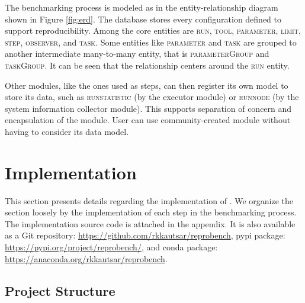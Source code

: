 The benchmarking process is modeled as in the entity-relationship diagram \citep{chen1976entity} shown in Figure \ref{fig:erd}.
The database stores every configuration defined to support reproducibility.
Among the core entities are \textsc{run}, \textsc{tool}, \textsc{parameter}, \textsc{limit}, \textsc{step}, \textsc{observer}, and \textsc{task}.
Some entities like \textsc{parameter} and \textsc{task} are grouped to another intermediate many-to-many entity, that is \textsc{parameterGroup} and \textsc{taskGroup}.
It can be seen that the relationship centers around the \textsc{run} entity.

Other modules, like the ones used as steps, can then register its own model to store its data, such as \textsc{runstatistic} (by the executor module) or \textsc{runnode} (by the system information collector module).
This supports separation of concern and encapsulation of the module.
User can use community-created module without having to consider its data model.

\section{Implementation}
\label{sec:impl.impl}

This section presents details regarding the implementation of \OurBenchmarkingTool.
We organize the section loosely by the implementation of each step in the benchmarking process.
The implementation source code is attached in the appendix.
It is also available as a Git repository: \url{https://github.com/rkkautsar/reprobench}, pypi package: \url{https://pypi.org/project/reprobench/}, and conda package: \url{https://anaconda.org/rkkautsar/reprobench}.

\subsection{Project Structure}
\label{sec:impl.structure}

